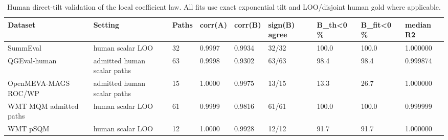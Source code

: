 \begin{table}[t]
\centering
\small
\begin{tabular}{lllllllll}
\toprule
Dataset & Setting & Paths & corr(A) & corr(B) & sign(B) agree & B\_th<0 \% & B\_fit<0 \% & median R2 \\
\midrule
SummEval & human scalar LOO & 32 & 0.9997 & 0.9934 & 32/32 & 100.0 & 100.0 & 1.000000 \\
QGEval-human & admitted human scalar paths & 63 & 0.9998 & 0.9302 & 63/63 & 98.4 & 98.4 & 0.999874 \\
OpenMEVA-MAGS ROC/WP & admitted human scalar paths & 15 & 1.0000 & 0.9975 & 13/15 & 13.3 & 26.7 & 1.000000 \\
WMT MQM admitted paths & human scalar LOO & 61 & 0.9999 & 0.9816 & 61/61 & 100.0 & 100.0 & 0.999999 \\
WMT pSQM & human scalar LOO & 12 & 1.0000 & 0.9928 & 12/12 & 91.7 & 91.7 & 1.000000 \\
\bottomrule
\end{tabular}
\vspace{0.25em}
\caption{Human direct-tilt validation of the local coefficient law. All fits use exact exponential tilt and LOO/disjoint human gold where applicable.}
\label{tab:direct-validation}
\end{table}

